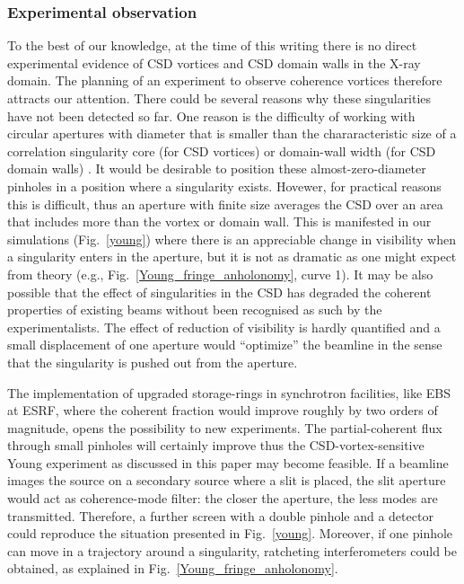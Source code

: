 \documentclass[%
 reprint,
 amsmath,amssymb,
 aps,
]{revtex4-1}
\begin{document}
\subsubsection{Experimental observation} 

To the best of our knowledge, at the time of this writing there is no direct experimental evidence of CSD vortices and CSD domain walls in the X-ray domain.  The planning of an experiment to observe  coherence vortices therefore attracts our attention. There could be several reasons why these singularities have not been detected so far. %
One reason is the difficulty of working with circular apertures with diameter that is smaller than the chararacteristic size of a correlation singularity core (for CSD vortices) or domain-wall width (for CSD domain walls) . It would be desirable to position these almost-zero-diameter pinholes in a position where a singularity exists. Hovewer, for practical reasons this is difficult, thus an aperture with finite size averages the CSD over an area that includes more than the vortex or domain wall. This is manifested in our simulations ({Fig.~\ref{young}}) where there is an appreciable change in visibility when a singularity enters in the aperture, but it is not as dramatic as one might expect from theory (e.g., {Fig.~\ref{Young_fringe_anholonomy}}, curve 1). It may be also possible that the effect of singularities in the CSD has degraded the coherent properties of existing beams without been recognised as such by the experimentalists. The effect of reduction of visibility is hardly quantified and a small displacement of one aperture would ``optimize'' the beamline in the sense that the singularity is pushed out from the aperture.  

The implementation of upgraded storage-rings in synchrotron facilities, like EBS at ESRF, where the coherent fraction would improve roughly by two orders of magnitude, opens the possibility to new experiments. The partial-coherent flux through small pinholes will certainly improve thus the CSD-vortex-sensitive Young experiment as discussed in this paper may become feasible. If a beamline images the source on a secondary source where a slit is placed, the slit aperture would act as coherence-mode filter: the closer the aperture, the less modes are transmitted. Therefore, a further screen with a double pinhole and a detector could reproduce the situation presented in {Fig.~\ref{young}}. Moreover, if one pinhole can move in a trajectory around a singularity, ratcheting interferometers could be obtained, as explained in {Fig.~\ref{Young_fringe_anholonomy}}. 
\end{document}
